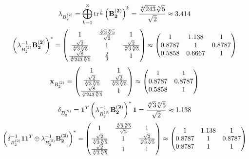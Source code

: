 \documentclass[10pt,a4paper]{article}
\begin{document}
	\[
		\lambda_{B_2^{(2)}} =  \bigoplus ^{3} _{k = 1} \operatorname{tr} ^{\frac 1 k} \left( \bold{B_2^{(2)}} \right)^k = \frac{\sqrt[4]{243}\sqrt[8]{5}} {\sqrt{2}}\approx 3.414
	\]
	\[
		\left(\lambda_{B_2^{(2)}}^{-1}\bold{B_2^{(2)}}\right)^* = 
		\begin{pmatrix}
			{1} {} & \frac{\sqrt[4]{3}\sqrt[8]{5}} {\sqrt{2}} & {1} {} \\
			\frac{\sqrt{2}} {\sqrt[4]{3}\sqrt[8]{5}} & {1} {} & \frac{\sqrt{2}} {\sqrt[4]{3}\sqrt[8]{5}} \\
			\frac{\sqrt{8}} {\sqrt[4]{243}\sqrt[8]{5}} & \frac{{2}} {{3}} & {1} {} \\
		\end{pmatrix}
		\approx
		\begin{pmatrix}
			1        & 1.138    & 1        \\
			0.8787   & 1        & 0.8787   \\
			0.5858   & 0.6667   & 1        \\
		\end{pmatrix}
	\]
	\[
		\bold{x}_{B_2^{(2)}} = 
		\begin{pmatrix}
			{1} {} & {1} {} \\
			\frac{\sqrt{2}} {\sqrt[4]{3}\sqrt[8]{5}} & \frac{\sqrt{2}} {\sqrt[4]{3}\sqrt[8]{5}} \\
			\frac{\sqrt{8}} {\sqrt[4]{243}\sqrt[8]{5}} & {1} {} \\
		\end{pmatrix}
		\approx
		\begin{pmatrix}
			1        & 1        \\
			0.8787   & 0.8787   \\
			0.5858   & 1        \\
		\end{pmatrix}
	\]
	\[
		\delta_{B_2^{(2)}} = \bold{1}^T \left(\lambda_{B_2^{(2)}}^{-1}\bold{B_2^{(2)}}\right)^* \bold{1} = \frac{\sqrt[4]{3}\sqrt[8]{5}} {\sqrt{2}}\approx 1.138
	\]
	\[
		\left(\delta_{B_2^{(2)}}^{-1}\bold{11}^T \oplus \lambda_{B_2^{(2)}}^{-1}\bold{B_2^{(2)}}\right)^* = 
		\begin{pmatrix}
			{1} {} & \frac{\sqrt[4]{3}\sqrt[8]{5}} {\sqrt{2}} & {1} {} \\
			\frac{\sqrt{2}} {\sqrt[4]{3}\sqrt[8]{5}} & {1} {} & \frac{\sqrt{2}} {\sqrt[4]{3}\sqrt[8]{5}} \\
			\frac{\sqrt{2}} {\sqrt[4]{3}\sqrt[8]{5}} & {1} {} & {1} {} \\
		\end{pmatrix}
		\approx
		\begin{pmatrix}
			1        & 1.138    & 1        \\
			0.8787   & 1        & 0.8787   \\
			0.8787   & 1        & 1        \\
		\end{pmatrix}
	\]
\end{document}
